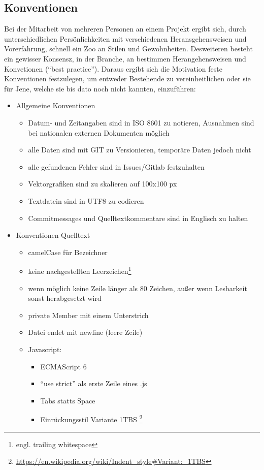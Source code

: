 \subsection{Konventionen}
Bei der Mitarbeit von mehreren Personen an einem Projekt ergibt sich, durch unterschiedlichen Persönlichkeiten mit verschiedenen Heransgehensweisen und Vorerfahrung, schnell ein Zoo an Stilen und Gewohnheiten. Desweiteren besteht ein gewisser Konsensz, in der Branche, an bestimmen Herangehensweisen und Konvetionen ("`best practice"'). Daraus ergibt sich die Motivation feste Konventionen festzulegen, um entweder Bestehende zu vereinheitlichen oder sie für Jene, welche sie bis dato noch nicht kannten, einzuführen:
\begin{itemize}
\item Allgemeine Konventionen
	\begin{itemize}
	\item Datum- und Zeitangaben sind in ISO 8601 zu notieren, Ausnahmen sind bei nationalen externen Dokumenten möglich
	\item alle Daten sind mit GIT zu Versionieren, temporäre Daten jedoch nicht
	\item alle gefundenen Fehler sind in Issues/Gitlab festzuhalten
	\item Vektorgrafiken sind zu skalieren auf 100x100 px
	\item Textdatein sind in UTF8 zu codieren
	\item Commitmessages und Quelltextkommentare sind in Englisch zu halten
	\end{itemize}
\item Konventionen Quelltext
	\begin{itemize}
	\item camelCase für Bezeichner
	\item keine nachgestellten Leerzeichen\footnote{engl. trailing whitespace}
	\item wenn möglich keine Zeile länger als 80 Zeichen, außer wenn Lesbarkeit sonst herabgesetzt wird
	\item private Member mit einem Unterstrich
	\item Datei endet mit newline (leere Zeile)
	\item Javascript:
		\begin{itemize}
		\item ECMAScript 6
		\item "`use strict"' als erste Zeile eines .js
		\item Tabs statts Space
		\item Einrückungsstil Variante 1TBS \footnote{\url{https://en.wikipedia.org/wiki/Indent_style\#Variant:_1TBS}}
		\end{itemize}
	\end{itemize}
\end{itemize}


